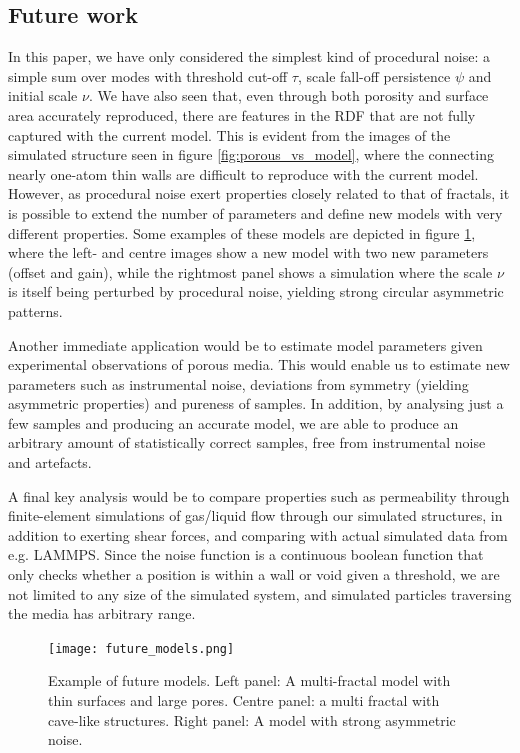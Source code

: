 \documentclass[aps,pre,twocolumn,letterpaper,floatfix,showpacs]{revtex4}
\begin{document}
\subsection{Future work}
In this paper, we have only considered the simplest kind of procedural noise: a simple sum over modes with threshold cut-off $\tau$, scale fall-off persistence $\psi$ and initial scale $\nu$. We have also seen that, even through both porosity and surface area accurately reproduced, there are features in the RDF that are not fully captured with the current model. This is evident from the images of the simulated structure seen in figure \ref{fig:porous_vs_model}, where the connecting nearly one-atom thin walls are difficult to reproduce with the current model. However, as procedural noise exert properties closely related to that of fractals, it is possible to extend the number of parameters and define new models with very different properties. Some examples of these models are depicted in figure \ref{fig:future_models}, where the left- and centre images show a new model with two new parameters (offset and gain), while the rightmost panel shows a simulation where the scale $\nu$ is itself being perturbed by procedural noise, yielding strong circular asymmetric patterns.   

Another immediate application would be to estimate model parameters given experimental observations of porous media. This would enable us to estimate new parameters such as instrumental noise, deviations from symmetry (yielding asymmetric properties) and pureness of samples. In addition, by analysing just a few samples and producing an accurate model, we are able to produce an arbitrary amount of statistically correct samples, free from instrumental noise and artefacts. 

A final key analysis would be to compare properties such as permeability through finite-element simulations of gas/liquid flow through our simulated structures, in addition to exerting shear forces, and comparing with actual simulated data from e.g. LAMMPS. Since the noise function is a continuous boolean function that only checks whether a position is within a wall or void given a threshold, we are not limited to any size of the simulated system, and simulated particles traversing the media has arbitrary range.  




\begin{figure}
\texttt{[image: future\_models.png]}
\caption{Example of future models. Left panel: A multi-fractal model with thin surfaces and large pores. Centre panel: a multi fractal with cave-like structures. Right panel: A model with strong asymmetric noise. }
\label{fig:future_models}
\end{figure}
\end{document}
